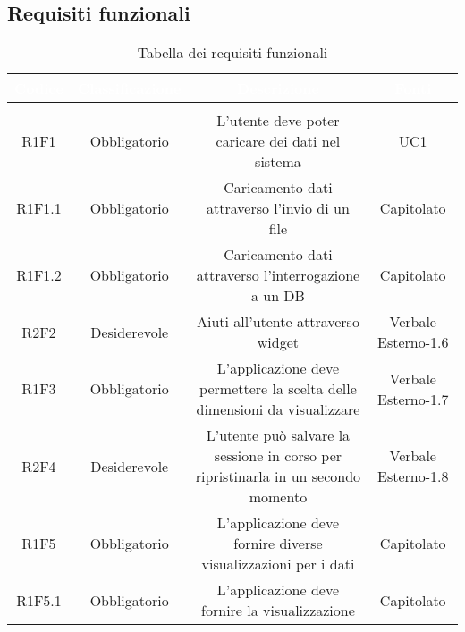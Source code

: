 \subsection{Requisiti funzionali}
\renewcommand{\arraystretch}{1.5}
\begin{center}
\begin{longtable}{C{\colA} C{\colB} C{\colC} C{\colA}}
		\textcolor{white}{\textbf{Codice}} & 
		\textcolor{white}{\textbf{Classificazione}} & 
		\textcolor{white}{\textbf{Descrizione}} & 
		\textcolor{white}{\textbf{Fonti}} \\
		\endfirsthead
	    \\
	    \endfoot
	    \caption{Tabella dei requisiti funzionali}
	    \endlastfoot

R1F1 & Obbligatorio & L'utente deve poter caricare dei dati nel sistema & UC1\\
R1F1.1 & Obbligatorio & Caricamento dati attraverso l'invio di un file  & Capitolato\\
R1F1.2 & Obbligatorio & Caricamento dati attraverso l'interrogazione a un DB & Capitolato\\
R2F2 & Desiderevole & Aiuti all'utente attraverso widget & Verbale Esterno-1.6 \\
R1F3 & Obbligatorio & L'applicazione deve permettere la scelta delle dimensioni da visualizzare & Verbale Esterno-1.7\\
R2F4 & Desiderevole & L'utente può salvare la sessione in corso per ripristinarla in un secondo momento & Verbale Esterno-1.8\\
R1F5 & Obbligatorio & L'applicazione deve fornire diverse visualizzazioni per i dati & Capitolato\\

R1F5.1 & Obbligatorio & L'applicazione deve fornire la visualizzazione  & Capitolato\\


\end{longtable}
\end{center}
